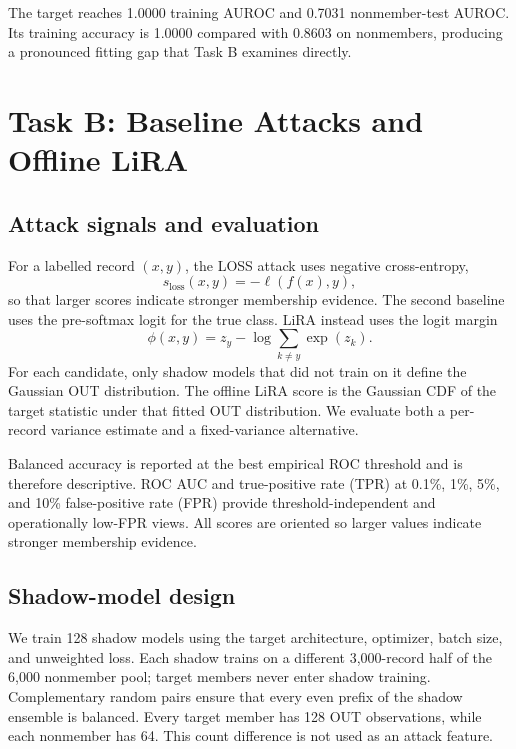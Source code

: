 \documentclass[11pt]{article}
\begin{document}
The target reaches 1.0000 training AUROC and 0.7031 nonmember-test AUROC. Its training
accuracy is 1.0000 compared with 0.8603 on nonmembers, producing a pronounced fitting gap
that Task B examines directly.

\section{Task B: Baseline Attacks and Offline LiRA}

\subsection{Attack signals and evaluation}

For a labelled record $(x,y)$, the LOSS attack uses negative cross-entropy,
\begin{equation}
  s_{\mathrm{loss}}(x,y)=-\ell(f(x),y),
\end{equation}
so that larger scores indicate stronger membership evidence. The second baseline uses the
pre-softmax logit for the true class. LiRA instead uses the logit margin
\begin{equation}
  \phi(x,y)=z_y-\log\sum_{k\ne y}\exp(z_k).
\end{equation}
For each candidate, only shadow models that did not train on it define the Gaussian OUT
distribution. The offline LiRA score is the Gaussian CDF of the target statistic under
that fitted OUT distribution. We evaluate both a per-record variance estimate and a
fixed-variance alternative.

Balanced accuracy is reported at the best empirical ROC threshold and is therefore
descriptive. ROC AUC and true-positive rate (TPR) at 0.1\%, 1\%, 5\%, and 10\%
false-positive rate (FPR) provide threshold-independent and operationally low-FPR views.
All scores are oriented so larger values indicate stronger membership evidence.

\subsection{Shadow-model design}

We train 128 shadow models using the target architecture, optimizer, batch size, and
unweighted loss. Each shadow trains on a different 3,000-record half of the 6,000
nonmember pool; target members never enter shadow training. Complementary random pairs
ensure that every even prefix of the shadow ensemble is balanced. Every target member has
128 OUT observations, while each nonmember has 64. This count difference is not used as
an attack feature.
\end{document}
